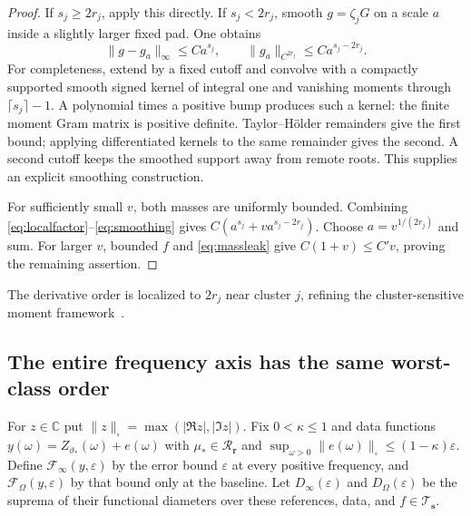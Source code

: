 \documentclass[10pt]{amsart}
\theoremstyle{definition}
\theoremstyle{remark}
\newcommand{\C}{\mathbb C}
\newcommand{\eps}{\varepsilon}
\newcommand{\F}{\mathcal F}
\newcommand{\Tclass}{\mathcal T_{\boldsymbol s}}
\newcommand{\Rclass}{\mathcal R_{\boldsymbol r}}
\begin{document}
\begin{proof}
If $s_j\ge2r_j$, apply this directly. If $s_j<2r_j$, smooth $g=\zeta_jG$ on a scale $a$ inside a slightly larger fixed pad. One obtains
\begin{equation}\label{eq:smoothing}
 \|g-g_a\|_\infty\le Ca^{s_j},\qquad
 \|g_a\|_{C^{2r_j}}\le Ca^{s_j-2r_j}.
\end{equation}
For completeness, extend by a fixed cutoff and convolve with a compactly supported smooth signed kernel of integral one and vanishing moments through $\lceil s_j\rceil-1$. A polynomial times a positive bump produces such a kernel: the finite moment Gram matrix is positive definite. Taylor--H\"older remainders give the first bound; applying differentiated kernels to the same remainder gives the second. A second cutoff keeps the smoothed support away from remote roots. This supplies an explicit smoothing construction.

For sufficiently small $v$, both masses are uniformly bounded. Combining \eqref{eq:localfactor}--\eqref{eq:smoothing} gives $C(a^{s_j}+va^{s_j-2r_j})$. Choose $a=v^{1/(2r_j)}$ and sum. For larger $v$, bounded $f$ and \eqref{eq:massleak} give $C(1+v)\le C'v$, proving the remaining assertion.
\end{proof}

The derivative order is localized to $2r_j$ near cluster $j$, refining the cluster-sensitive moment framework~\cite{wuyang,nguyen}.

\subsection{The entire frequency axis has the same worst-class order}
For $z\in\C$ put $\|z\|_\square=\max(|\Re z|,|\Im z|)$. Fix $0<\kappa\le1$ and data functions $y(\omega)=Z_{\vartheta_*}(\omega)+e(\omega)$ with $\mu_*\in\Rclass$ and $\sup_{\omega>0}\|e(\omega)\|_\square\le(1-\kappa)\eps$. Define $\F_\infty(y,\eps)$ by the error bound $\eps$ at every positive frequency, and $\F_\Omega(y,\eps)$ by that bound only at the baseline. Let $D_\infty(\eps)$ and $D_\Omega(\eps)$ be the suprema of their functional diameters over these references, data, and $f\in\Tclass$.
\end{document}
